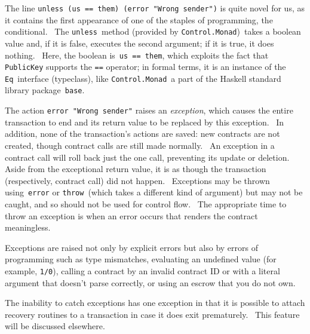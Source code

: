 \documentclass[11pt]{article}
\begin{document}
The line \texttt{unless (us == them) (error "Wrong sender")} is quite novel for us, as it contains the first appearance of one of the staples of programming, the conditional.  The \texttt{unless} method (provided by \texttt{Control.Monad}) takes a boolean value and, if it is false, executes the second argument; if it is true, it does nothing.  Here, the boolean is \texttt{us == them}, which exploits the fact that \texttt{PublicKey} supports the \texttt{==} operator; in formal terms, it is an instance of the \texttt{Eq} interface (typeclass), like \texttt{Control.Monad} a part of the Haskell standard library package \texttt{base}.\texttt{ }


\vspace{11pt}

The action \texttt{error "Wrong sender"} raises an \textit{exception}, which causes the entire transaction to end and its return value to be replaced by this exception.  In addition, none of the transaction's actions are saved: new contracts are not created, though contract calls are still made normally.  An exception in a contract call will roll back just the one call, preventing its update or deletion.  Aside from the exceptional return value, it is as though the transaction (respectively, contract call) did not happen.  Exceptions may be thrown using \texttt{error} or \texttt{throw} (which takes a different kind of argument) but may not be caught, and so should not be used for control flow.  The appropriate time to throw an exception is when an error occurs that renders the contract meaningless.


\vspace{11pt}

Exceptions are raised not only by explicit errors but also by errors of programming such as type mismatches, evaluating an undefined value (for example, \texttt{1\slash{}0}), calling a contract by an invalid contract ID or with a literal argument that doesn't parse correctly, or using an escrow that you do not own.


\vspace{11pt}

The inability to catch exceptions has one exception in that it is possible to attach recovery routines to a transaction in case it does exit prematurely.  This feature will be discussed elsewhere.
\end{document}
